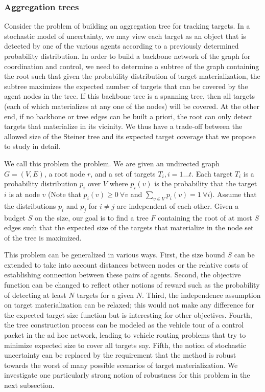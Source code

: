 \subsubsection{Aggregation trees}
\label{sec:aggregation}
Consider the problem of building an aggregation tree for tracking
targets.  In a stochastic model of uncertainty, we may view each
target as an object that is detected by one of the various agents
according to a previously determined probability distribution.  In
order to build a backbone network of the graph for coordination and
control, we need to determine a subtree of the graph containing the
root such that given the probability distribution of target
materialization, the subtree maximizes the expected number of targets
that can be covered by the agent nodes in the tree. If this backbone
tree is a spanning tree, then all targets (each of which materializes
at any one of the nodes) will be covered. At the other end, if no
backbone or tree edges can be built a priori, the root can only detect
targets that materialize in its vicinity. We thus have a trade-off
between the allowed size of the Steiner tree and its expected target
coverage that we propose to study in detail.

We call this problem the  problem.  We are given an undirected graph $G =
(V,E)$, a root node $r$, and a set of targets $T_i, i = 1 \ldots
t$. Each target $T_i$ is a probability distribution $p_i$ over $V$
where $p_i(v)$ is the probability that the target $i$ is at node $v$
(Note that $p_i(v) \geq 0 \ \forall v$ and $\sum_{v \in V} p_i(v) = 1
\ \forall i$). Assume that the distributions $p_i$ and $p_j$ for $i
\neq j$ are independent of each other. Given a budget $S$ on the size, our
goal is to find a tree $F$ containing the root of at most $S$ edges
such that the expected size of the targets that materialize in the
node set of the tree is maximized.

This problem can be generalized in various ways. First, the size bound
$S$ can be extended to take into account distances between nodes or
the relative costs of establishing connection between these pairs of
agents. Second, the objective function can be changed to reflect other
notions of reward such as the probability of detecting at least $N$
targets for a given $N$. Third, the independence assumption on target
materialization can be relaxed; this would not make any difference for
the expected target size function but is interesting for other
objectives. Fourth, the tree construction process can be modeled as
the vehicle tour of a control packet in the ad hoc network, leading to
vehicle routing problems that try to minimize expected size to cover
all targets say. Fifth, the notion of stochastic uncertainty can be
replaced by the requirement that the method is robust towards the
worst of many possible scenarios of target materialization. We
investigate one particularly strong notion of robustness for this
problem in the next subsection.

